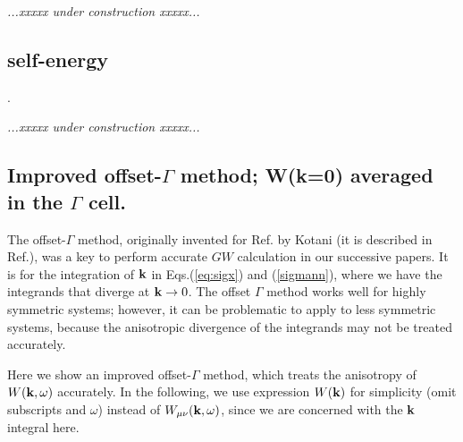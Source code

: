 \documentclass[a4paper,10pt,epsf,fleqn]{article}
\def\underconstruction{{\it...xxxxx under construction xxxxx...\\}}
\newcommand{\bfq}{{\bf q}}
\newcommand{\bfk}{{\bf k}}
\newcommand{\req}[1]{\mbox{Eq.~(\ref{#1})}}
\begin{document}
\underconstruction

\subsection{self-energy}.

\underconstruction

\subsection{Improved offset-$\Gamma$ method; 
W(k=0) averaged in the $\Gamma$ cell.}
\label{sec:kint}
The offset-$\Gamma$ method, originally 
invented for Ref.\cite{kotani_all-electron_2002} by Kotani 
(it is described in Ref.\cite{kotani_quasiparticle_2007}), 
was a key to perform accurate $GW$ calculation in our successive papers.
It is for the integration of $\bfk$ 
in Eqs.(\ref{eq:sigx}) and (\ref{sigmann}), where
we have the integrands that diverge at $\bfk \to 0$.
The offset $\Gamma$ method works well 
for highly symmetric systems; however,
it can be problematic to apply to less symmetric systems, 
because the anisotropic divergence of the integrands 
may not be treated accurately.

Here we show an improved offset-$\Gamma$ method, which treats
the anisotropy of $W(\bfk,\omega)$ accurately.
In the following, we use expression $W(\bfk)$
for simplicity (omit subscripts and $\omega$)
instead of $W_{\mu \nu}(\bfk,\omega)$, 
since we are concerned with the $\bfk$ integral here.

\end{document}
